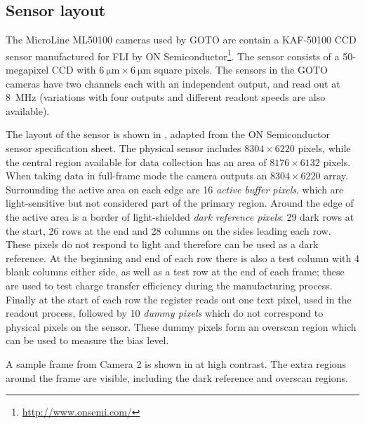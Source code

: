 \begin{colsection}
\begin{colsection}
\clearpage

\end{colsection}

\subsection{Sensor layout}
\label{sec:sensors}
\begin{colsection}

The MicroLine ML50100 cameras used by GOTO are contain a KAF-50100 CCD sensor manufactured for FLI by ON Semiconductor\footnote{\url{http://www.onsemi.com/}}. The sensor consists of a 50-megapixel CCD with $\SI{6}{\micro\metre} \times \SI{6}{\micro\metre}$ square pixels. The sensors in the GOTO cameras have two channels each with an independent output, and read out at \SI{8}{\mega\hertz} (variations with four outputs and different readout speeds are also available).

The layout of the sensor is shown in , adapted from the ON Semiconductor sensor specification sheet. The physical sensor includes $8304 \times 6220$ pixels, while the central region available for data collection has an area of $8176 \times 6132$ pixels. When taking data in full-frame mode the camera outputs an $8304 \times 6220$ array. Surrounding the active area on each edge are 16 \emph{active buffer pixels}, which are light-sensitive but not considered part of the primary region. Around the edge of the active area is a border of light-shielded \emph{dark reference pixels}: 29 dark rows at the start, 26 rows at the end and 28 columns on the sides leading each row. These pixels do not respond to light and therefore can be used as a dark reference. At the beginning and end of each row there is also a test column with 4 blank columns either side, as well as a test row at the end of each frame; these are used to test charge transfer efficiency during the manufacturing process. Finally at the start of each row the register reads out one text pixel, used in the readout process, followed by 10 \emph{dummy pixels} which do not correspond to physical pixels on the sensor. These dummy pixels form an overscan region which can be used to measure the bias level.

A sample frame from Camera 2 is shown in  at high contrast. The extra regions around the frame are visible, including the dark reference and overscan regions.


\end{colsection}
\end{colsection}
